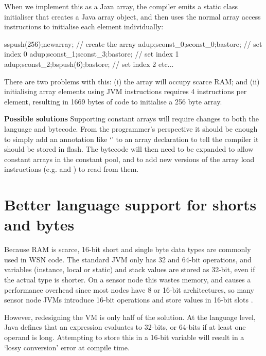 When we implement this as a  Java array, the compiler emits a static class initialiser that creates a Java array object, and then uses the normal array access instructions to initialise each element individually:

sspush(256);newarray;       // create the array
adup;sconst\_0;sconst\_0;bastore;  // set index 0
adup;sconst\_1;sconst\_3;bastore;  // set index 1
adup;sconst\_2;bspush(6);bastore; // set index 2
etc...


There are two problems with this: (i) the array will occupy scarce RAM; and (ii) initialising array elements using JVM instructions requires 4 instructions per element, resulting in 1669 bytes of code to initialise a 256 byte array.

% 

\textbf{Possible solutions}
Supporting constant arrays will require changes to both the language and bytecode. From the programmer's perspective it should be enough to simply add an annotation like `' to an array declaration to tell the compiler it should be stored in flash. The bytecode will then need to be expanded to allow constant arrays in the constant pool, and to add new versions of the array load instructions (e.g.  and ) to read from them.



\section{Better language support for shorts and bytes}
\label{sec-small-datatypes}
Because RAM is scarce, 16-bit short and single byte data types are commonly used in WSN code. The standard JVM only has 32 and 64-bit operations, and variables (instance, local or static) and stack values are stored as 32-bit, even if the actual type is shorter. On a sensor node this wastes memory, and causes a performance overhead since most nodes have 8 or 16-bit architectures, so many sensor node JVMs introduce 16-bit operations and store values in 16-bit slots \cite{Brouwers:2009cj}.

However, redesigning the VM is only half of the solution. At the language level, Java defines that an expression evaluates to 32-bits, or 64-bits if at least one operand is long. Attempting to store this in a 16-bit variable will result in a `lossy conversion' error at compile time.

